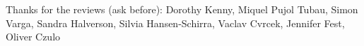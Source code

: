 \begin{refsection}


Thanks for the reviews (ask before): Dorothy Kenny, Miquel Pujol Tubau, Simon Varga, Sandra Halverson, Silvia Hansen-Schirra, Vaclav Cvrcek, Jennifer Fest, Oliver Czulo


\printbibliography[heading=subbibliography]
\end{refsection}
